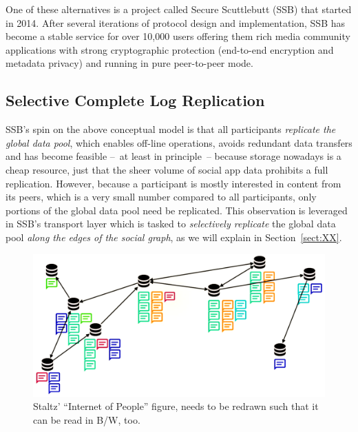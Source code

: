 \documentclass[10pt,sigconf]{acmart}
\begin{document}
One of these alternatives is a project called Secure Scuttlebutt (SSB)
that started in 2014. After several iterations of protocol design and
implementation, SSB has become a stable service for over 10,000 users
offering them rich media community applications with strong
cryptographic protection (end-to-end encryption and metadata privacy)
and running in pure peer-to-peer mode.

\subsection*{Selective Complete Log Replication}

SSB's spin on the above conceptual model is that all participants {\em
  replicate the global data pool}, which enables off-line operations,
avoids redundant data transfers and has become feasible --~at least in
principle~-- because storage nowadays is a cheap resource, just that
the sheer volume of social app data prohibits a full
replication. However, because a participant is mostly interested in
content from its peers, which is a very small number compared to all
participants, only portions of the global data pool need be
replicated. This observation is leveraged in SSB's transport layer
which is tasked to {\em selectively replicate} the global data pool
{\em along the edges of the social graph}, as we will explain in
Section~\ref{sect:XX}.

\begin{figure}[htb]
  \includegraphics[width=0.9\columnwidth]{figs/staltz-iop.pdf}
  \caption{Staltz' ``Internet of People'' figure, needs to be redrawn
    such that it can be read in B/W, too.\label{fig:net-of-people}}
\end{figure}
\end{document}
